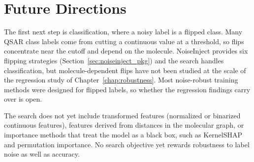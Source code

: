 \section{Future Directions}

The first next step is classification, where a noisy label is a flipped class. Many QSAR class labels come from cutting a continuous value at a threshold, so flips concentrate near the cutoff and depend on the molecule. NoiseInject provides six flipping strategies (Section~\ref{sec:noiseinject_pkg}) and the search handles classification, but molecule-dependent flips have not been studied at the scale of the regression study of Chapter~\ref{chap:robustness}. Most noise-robust training methods were designed for flipped labels, so whether the regression findings carry over is open.

The search does not yet include transformed features (normalized or binarized continuous features), features derived from distances in the molecular graph, or importance methods that treat the model as a black box, such as KernelSHAP and permutation importance. No search objective yet rewards robustness to label noise as well as accuracy.


